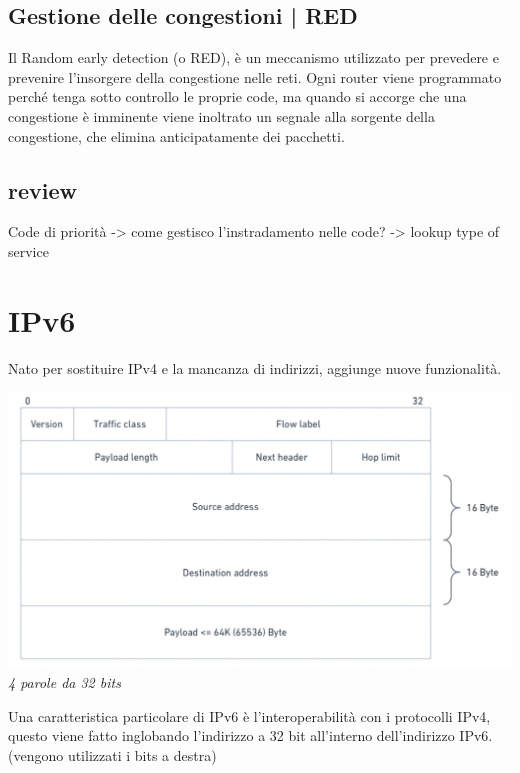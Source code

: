 \documentclass[11pt, oneside]{article}   	%
\begin{document}
\subsection{Gestione delle congestioni | RED}
Il Random early detection (o RED), è un meccanismo utilizzato per prevedere e prevenire l'insorgere della congestione nelle reti. Ogni router viene programmato perché tenga sotto controllo le proprie code, ma quando si accorge che una congestione è imminente viene inoltrato un segnale alla sorgente della congestione, che elimina anticipatamente dei pacchetti. 

\subsection*{review}
Code di priorità -> come gestisco l'instradamento nelle code? -> lookup type of service

\section*{IPv6}
Nato per sostituire IPv4 e la mancanza di indirizzi, aggiunge nuove funzionalità.
\begin{center}
\includegraphics[scale=0.5]{ipv6}
\emph{4 parole da 32 bits}
\end{center}
Una caratteristica particolare di IPv6 è l'interoperabilità con i protocolli IPv4, questo viene fatto inglobando l'indirizzo a 32 bit all'interno dell'indirizzo IPv6. (vengono utilizzati i bits a destra)
\end{document}
